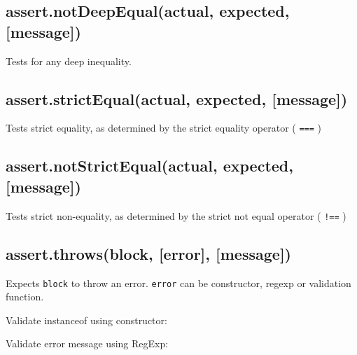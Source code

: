 \subsection{assert.notDeepEqual(actual, expected, {[}message{]})}

Tests for any deep inequality.

\subsection{assert.strictEqual(actual, expected, {[}message{]})}

Tests strict equality, as determined by the strict equality operator (
\texttt{===} )

\subsection{assert.notStrictEqual(actual, expected, {[}message{]})}

Tests strict non-equality, as determined by the strict not equal
operator ( \texttt{!==} )

\subsection{assert.throws(block, {[}error{]}, {[}message{]})}

Expects \texttt{block} to throw an error. \texttt{error} can be
constructor, regexp or validation function.

Validate instanceof using constructor:

\begin{Shaded}
\begin{Highlighting}[]
\NormalTok{(}
  \NormalTok{() \{}
      \NormalTok{);}
  \NormalTok{\},}
\NormalTok{);}
\end{Highlighting}
\end{Shaded}

Validate error message using RegExp:

\begin{Shaded}
\begin{Highlighting}[]
\NormalTok{(}
  \NormalTok{() \{}
      \NormalTok{);}
  \NormalTok{\},}
\NormalTok{);}
\end{Highlighting}
\end{Shaded}

